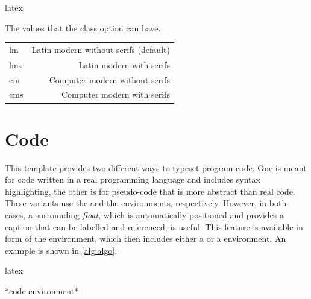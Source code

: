 \begin{algorithm}
    \caption{%
        An example of how the  command can be used.
    }%
    \label{alg:caption}
    \begin{code}{latex}
\begin{table}
    {The values that the class option  can have.}%
    \label{tab:fontoption}
    \begin{tabular}{l r}
        \toprule
        \tblhead{Value} & \tblhead{Used Font}\\
        \midrule
        lm  & Latin modern without serifs (default)\\
        lms & Latin modern with serifs\\
        cm  & Computer modern without serifs\\
        cms & Computer modern with serifs\\
        \bottomrule
    \end{tabular}
\end{table}
    \end{code}
\end{algorithm}

\section{Code}%
\label{sec:code}

This template provides two different ways to typeset program code. One is
meant for code written in a real programming language and includes syntax
highlighting, the other is for pseudo-code that is more abstract than real
code.  These variants use the  and the 
environments, respectively.  However, in both cases, a surrounding
\emph{float}, which is automatically positioned and provides a caption that
can be labelled and referenced, is useful. This feature is available in form
of the  environment, which then includes either a  or
a  environment. An example is shown in \autoref{alg:algo}.

\begin{algorithm}
    \caption{%
        Example of an  float enclosing a
         environment to display its own code.
    }%
    \label{alg:algo}
    \begin{code}{latex}
\begin{algorithm}
    \caption{%
        Example of an  float enclosing a
         environment to display its own code.
     }%
    \label{alg:algo}
    *code environment*
\end{algorithm}
    \end{code}
\end{algorithm}

